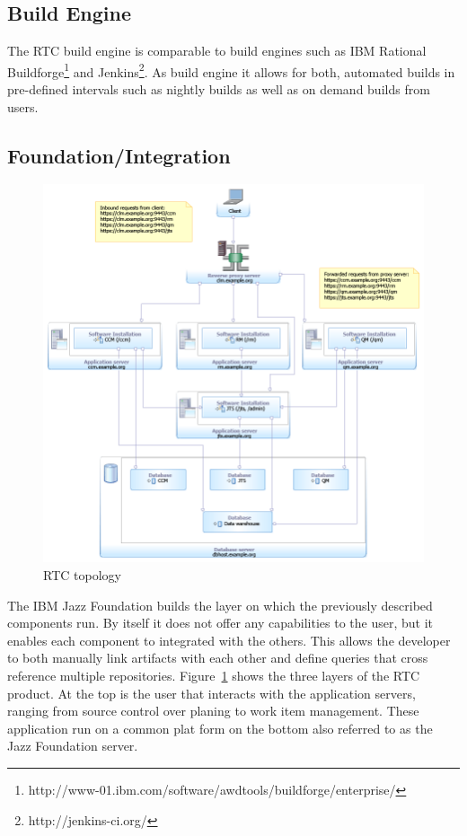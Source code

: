\subsection{Build Engine}
The RTC build engine is comparable to build engines such as IBM Rational Buildforge\footnote{http://www-01.ibm.com/software/awdtools/buildforge/enterprise/} and Jenkins\footnote{http://jenkins-ci.org/}.
As build engine it allows for both, automated builds in pre-defined intervals such as nightly builds as well as on demand builds from users.

\subsection{Foundation/Integration}
\begin{figure}[t]
\centering
\includegraphics[width=.8\textwidth]{figures/meet-rtc.tex/rtc-topology}
\caption{RTC topology}
\label{fig:rtctopology}
\end{figure}
The IBM Jazz Foundation builds the layer on which the previously described components run.
By itself it does not offer any capabilities to the user, but it enables each component to integrated with the others. 
This allows the developer to both manually link artifacts with each other and define queries that cross reference multiple repositories.
Figure~\ref{fig:rtctopology} shows the three layers of the RTC product.
At the top is the user that interacts with the application servers, ranging from source control over planing to work item management.
These application run on a common plat form on the bottom also referred to as the Jazz Foundation server.

